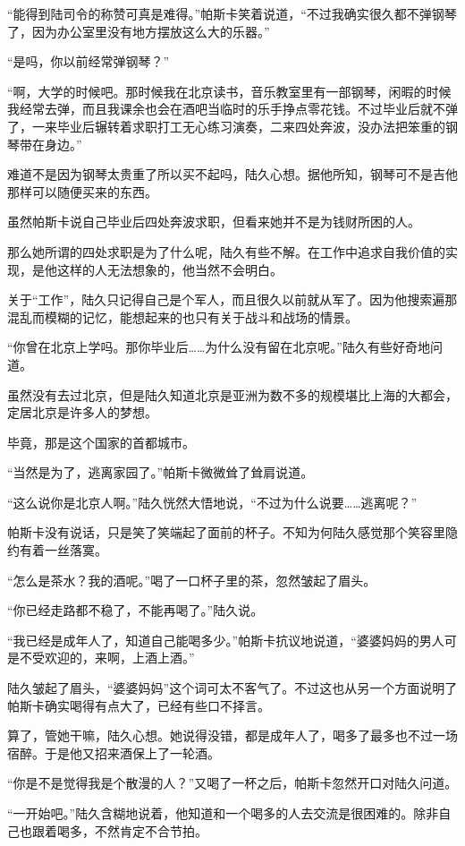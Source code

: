 “能得到陆司令的称赞可真是难得。”帕斯卡笑着说道，“不过我确实很久都不弹钢琴了，因为办公室里没有地方摆放这么大的乐器。”

“是吗，你以前经常弹钢琴？”

“啊，大学的时候吧。那时候我在北京读书，音乐教室里有一部钢琴，闲暇的时候我经常去弹，而且我课余也会在酒吧当临时的乐手挣点零花钱。不过毕业后就不弹了，一来毕业后辗转着求职打工无心练习演奏，二来四处奔波，没办法把笨重的钢琴带在身边。”

难道不是因为钢琴太贵重了所以买不起吗，陆久心想。据他所知，钢琴可不是吉他那样可以随便买来的东西。

虽然帕斯卡说自己毕业后四处奔波求职，但看来她并不是为钱财所困的人。

那么她所谓的四处求职是为了什么呢，陆久有些不解。在工作中追求自我价值的实现，是他这样的人无法想象的，他当然不会明白。

关于“工作”，陆久只记得自己是个军人，而且很久以前就从军了。因为他搜索遍那混乱而模糊的记忆，能想起来的也只有关于战斗和战场的情景。

“你曾在北京上学吗。那你毕业后……为什么没有留在北京呢。”陆久有些好奇地问道。

虽然没有去过北京，但是陆久知道北京是亚洲为数不多的规模堪比上海的大都会，定居北京是许多人的梦想。

毕竟，那是这个国家的首都城市。

“当然是为了，逃离家园了。”帕斯卡微微耸了耸肩说道。

“这么说你是北京人啊。”陆久恍然大悟地说，“不过为什么说要……逃离呢？”

帕斯卡没有说话，只是笑了笑端起了面前的杯子。不知为何陆久感觉那个笑容里隐约有着一丝落寞。

“怎么是茶水？我的酒呢。”喝了一口杯子里的茶，忽然皱起了眉头。

“你已经走路都不稳了，不能再喝了。”陆久说。

“我已经是成年人了，知道自己能喝多少。”帕斯卡抗议地说道，“婆婆妈妈的男人可是不受欢迎的，来啊，上酒上酒。”

陆久皱起了眉头，“婆婆妈妈”这个词可太不客气了。不过这也从另一个方面说明了帕斯卡确实喝得有点大了，已经有些口不择言。

算了，管她干嘛，陆久心想。她说得没错，都是成年人了，喝多了最多也不过一场宿醉。于是他又招来酒保上了一轮酒。

“你是不是觉得我是个散漫的人？”又喝了一杯之后，帕斯卡忽然开口对陆久问道。

“一开始吧。”陆久含糊地说着，他知道和一个喝多的人去交流是很困难的。除非自己也跟着喝多，不然肯定不合节拍。

